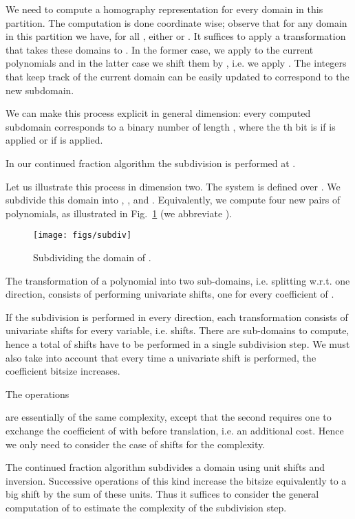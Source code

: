 \documentclass{sig-alternate}
\begin{document}
We need to compute a homography representation for every domain in
this partition. The computation is done coordinate wise; observe that
for any domain in this partition we have, for all , either
 or . It suffices to apply a
transformation that takes these domains to . In the former case,
we apply  to the current polynomials and in the latter
case we shift them by , i.e. we apply . The integers
 that keep track of the current
domain can be easily updated to correspond to the new subdomain.

We can make this process explicit in general dimension: every computed subdomain
corresponds to a binary number of length , where the th bit is
 if  is applied or  if  is applied. 

In our continued fraction algorithm the subdivision is performed at .

 Let us illustrate this process in dimension
two. The system  is defined over . We subdivide this
domain into , ,  and
. Equivalently, we compute four new pairs of
polynomials, as illustrated in Fig.~\ref{fig:subdiv} (we abbreviate
).
\begin{figure}[h]
  \centering
  \texttt{[image: figs/subdiv]}
  \caption{Subdividing the domain of .}
  \label{fig:subdiv}
\end{figure}




The transformation of a polynomial into two sub-domains,
i.e. splitting w.r.t. one direction, consists of performing 
univariate shifts, one for every coefficient  of
.

If the subdivision is performed in every direction, each
transformation consists of  univariate shifts for every
variable, i.e.  shifts. There are  sub-domains to
compute, hence a total of  shifts have to be
performed in a single subdivision step. We must also take into account
that every time a univariate shift is performed, the coefficient
bitsize increases.

The operations 

are essentially of the same complexity, except that the second
requires one to exchange the coefficient of 
with  before translation, i.e. an
additional  cost. Hence we only need to consider the case of
shifts for the complexity.

The continued fraction algorithm subdivides a domain using unit shifts
and inversion.  Successive operations of this kind increase the bitsize
equivalently to a big shift by the sum of these units. Thus it
suffices to consider the general computation of 
to estimate the complexity of the subdivision step.
\end{document}

